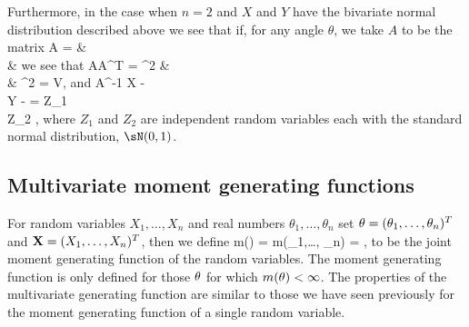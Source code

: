 Furthermore, in the case when $n = 2$ and $X$ and $Y$ have the bivariate normal distribution described above we see that if, for any angle $\theta$, we take $A$ to be the matrix 
\be
A = \bepm
\sigma  \cos\bb{\theta + \arccos \rho } & \sigma  \sin\bb{\theta+ \arccos \rho }\\
\tau \cos \theta & \tau \sin \theta
\eepm
\ee
we see that
\be
AA^T = \bepm
\sigma^2  & \rho \sigma \tau\\
\rho \sigma \tau & \tau^2
\eepm
= V,
\ee
and
\be
A^{-1} \bepm
X - \mu\\
Y - \nu 
\eepm
= \bepm
Z_1\\
Z_2
\eepm,
\ee
where $Z_1$ and $Z_2$ are independent random variables each with the standard normal distribution, $\sN(0, 1)$.


\subsection{Multivariate moment generating functions}

For random variables $X_1,\dots ,X_n$ and real numbers $\theta_1,\dots , \theta_n$ set ${\bf \theta} = (\theta_1,\dots , \theta_n)^T$ and ${\bf X} = (X_1,\dots ,X_n)^T$, then we define
\be
m({\bf\theta}) = m(\theta_1,\dots , \theta_n) = \E{} ,
\ee
to be the joint moment generating function of the random variables. The moment generating function is only defined for those ${\bf\theta}$ for which $m({\bf \theta}) < \infty$. The properties of the multivariate generating function are similar to those we have seen previously for the moment generating function of a single random variable.

